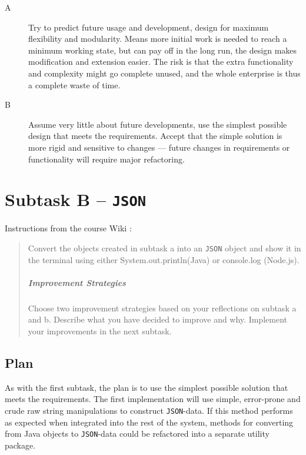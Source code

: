 \begin{description}
  \item [A] Try to predict future usage and development, design for maximum 
        flexibility and modularity. Means more initial work is needed to reach
        a minimum working state, but can pay off in the long run, the design
        makes modification and extension easier.  The risk is that the extra
        functionality and complexity might go complete unused, and the whole
        enterprise is thus a complete waste of time.
  \item [B] Assume very little about future developments, use the simplest 
        possible design that meets the requirements. Accept that the simple 
        solution is more rigid and sensitive to changes --- future changes in 
        requirements or functionality will require major refactoring.
\end{description}


\section{Subtask B -- \texttt{JSON}}\label{subtask-b-json}
Instructions from the course Wiki \cite{1dv600:lab1:instructions}:

\begin{quote}
  Convert the objects created in subtask a into an \texttt{JSON} object and show it in
  the terminal using either System.out.println(Java) or console.log (Node.js).
  
  \subparagraph{Improvement Strategies}
  
  Choose two improvement strategies based on your reflections on subtask a and
  b. Describe what you have decided to improve and why. Implement your 
  improvements in the next subtask.
\end{quote}


\subsection{Plan}\label{task-1b-plan}
As with the first subtask, the plan is to use the simplest possible solution
that meets the requirements.
The first implementation will use simple, error-prone and crude raw string
manipulations to construct \texttt{JSON}-data.
If this method performs as expected when integrated into the rest of the system,
methods for converting from Java objects to \texttt{JSON}-data could be refactored into
a separate utility package.


